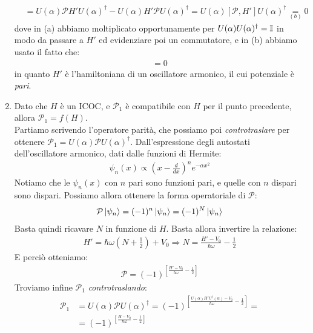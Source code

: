 \documentclass[../../FisicaTeorica.tex]{subfiles}
\begin{document}
\begin{enumerate}
\begin{align*}
&=U(\alpha) \mathcal{P} H' U(\alpha)^\dag - U(\alpha)H' \mathcal{P}U(\alpha)^\dag = U(\alpha)[\mathcal{P},H']U(\alpha)^\dag \underset{(b)}{=} 0
\end{align*}
dove in (a) abbiamo moltiplicato opportunamente per $U(\alpha)U(\alpha)^\dag = \mathbb{I}$ in modo da passare a $H'$ ed evidenziare poi un commutatore, e in (b) abbiamo usato il fatto che:
\begin{align*}
[\mathcal{P},H']=0
\end{align*}
in quanto $H'$ è l'hamiltoniana di un oscillatore armonico, il cui potenziale è \textit{pari}.

\item Dato che $H$ è un ICOC, e $\mathcal{P}_1$ è compatibile con $H$ per il punto precedente, allora $\mathcal{P}_1 = f(H)$.\\
Partiamo scrivendo l'operatore parità, che possiamo poi \textit{controtraslare} per ottenere $\mathcal{P}_1 = U(\alpha)\mathcal{P}U(\alpha)^\dag$. Dall'espressione degli autostati dell'oscillatore armonico, dati dalle funzioni di Hermite:
\begin{align*}
\psi_n(x) \propto \left( x- \frac{d}{dx}\right)^{n} e^{-\alpha x^2}
\end{align*}
Notiamo che le $\psi_n(x)$ con $n$ pari sono funzioni pari, e quelle con $n$ dispari sono dispari. Possiamo allora ottenere la forma operatoriale di $\mathcal{P}$:
\begin{align*}
\mathcal{P}\Ket{\psi_n} = (-1)^n \Ket{\psi_n} = (-1)^N \Ket{\psi_n}
\end{align*}
Basta quindi ricavare $N$ in funzione di $H$. Basta allora invertire la relazione:
\begin{align*}
H' = \hbar \omega\left(N+\frac{1}{2}\right) + V_0 \Rightarrow  N = \frac{H'-V_0}{\hbar \omega}-\frac{1}{2}
\end{align*}
E perciò otteniamo:
\begin{align*}
\mathcal{P} = (-1)^{\displaystyle\left[ \frac{H'-V_0}{\hbar \omega}-\frac{1}{2}\right]}
\end{align*}
Troviamo infine $\mathcal{P}_1$ \textit{controtraslando}:
\begin{align*}
\mathcal{P}_1 &= U(\alpha)\mathcal{P}U(\alpha)^\dag = (-1)^{\displaystyle\left[\frac{U(\alpha)H' U^\dag(\alpha) - V_0}{\hbar \omega}-\frac{1}{2} \right]} = \\
&=(-1)^{\displaystyle\left[\frac{H-V_0}{\hbar \omega}-\frac{1}{2} \right ]}
\end{align*}
\end{enumerate}
\end{document}
